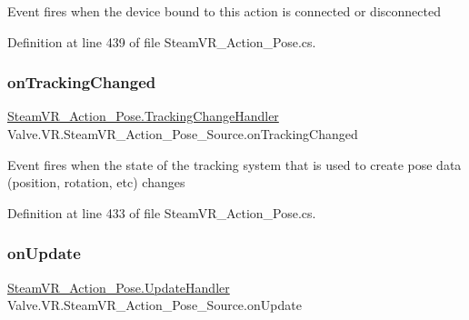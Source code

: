 Event fires when the device bound to this action is connected or disconnected 



Definition at line 439 of file Steam\+V\+R\+\_\+\+Action\+\_\+\+Pose.\+cs.

\mbox{\label{class_valve_1_1_v_r_1_1_steam_v_r___action___pose___source_a609ff1f6d20188ba1a0866e7f8ec8735}} 
\subsubsection{\texorpdfstring{onTrackingChanged}{onTrackingChanged}}
{\footnotesize\ttfamily \mbox{\hyperlink{class_valve_1_1_v_r_1_1_steam_v_r___action___pose_a52e352705659c14685cf8a88ef4bafd6}{Steam\+V\+R\+\_\+\+Action\+\_\+\+Pose.\+Tracking\+Change\+Handler}} Valve.\+V\+R.\+Steam\+V\+R\+\_\+\+Action\+\_\+\+Pose\+\_\+\+Source.\+on\+Tracking\+Changed}



Event fires when the state of the tracking system that is used to create pose data (position, rotation, etc) changes 



Definition at line 433 of file Steam\+V\+R\+\_\+\+Action\+\_\+\+Pose.\+cs.

\mbox{\label{class_valve_1_1_v_r_1_1_steam_v_r___action___pose___source_a0850a14fdf071a66d2c8009254d22855}} 
\subsubsection{\texorpdfstring{onUpdate}{onUpdate}}
{\footnotesize\ttfamily \mbox{\hyperlink{class_valve_1_1_v_r_1_1_steam_v_r___action___pose_a243e7046a430c572e5be3d1b6b322b6d}{Steam\+V\+R\+\_\+\+Action\+\_\+\+Pose.\+Update\+Handler}} Valve.\+V\+R.\+Steam\+V\+R\+\_\+\+Action\+\_\+\+Pose\+\_\+\+Source.\+on\+Update}




